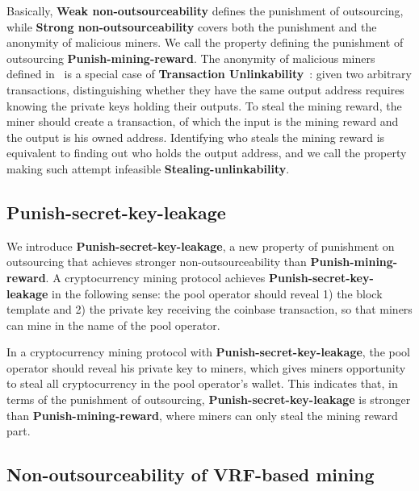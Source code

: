 Basically, \textbf{Weak non-outsourceability} defines the punishment of outsourcing, while \textbf{Strong non-outsourceability} covers both the punishment and the anonymity of malicious miners.
We call the property defining the punishment of outsourcing \textbf{Punish-mining-reward}.
The anonymity of malicious miners defined in~\cite{miller2015nonoutsourceable} is a special case of \textbf{Transaction Unlinkability}~\cite{van2013cryptonote}: given two arbitrary transactions, distinguishing whether they have the same output address requires knowing the private keys holding their outputs.
To steal the mining reward, the miner should create a transaction, of which the input is the mining reward and the output is his owned address.
Identifying who steals the mining reward is equivalent to finding out who holds the output address, and we call the property making such attempt infeasible \textbf{Stealing-unlinkability}.


\subsection{Punish-secret-key-leakage}

We introduce \textbf{Punish-secret-key-leakage}, a new property of punishment on outsourcing that achieves stronger non-outsourceability than \textbf{Punish-mining-reward}.
A cryptocurrency mining protocol achieves \textbf{Punish-secret-key-leakage} in the following sense: the pool operator should reveal 1) the block template and 2) the private key receiving the coinbase transaction, so that miners can mine in the name of the pool operator.

In a cryptocurrency mining protocol with \textbf{Punish-secret-key-leakage}, the pool operator should reveal his private key to miners, which gives miners opportunity to steal all cryptocurrency in the pool operator's wallet.
This indicates that, in terms of the punishment of outsourcing, \textbf{Punish-secret-key-leakage} is stronger than \textbf{Punish-mining-reward}, where miners can only steal the mining reward part.






\subsection{Non-outsourceability of VRF-based mining}

